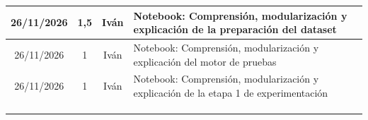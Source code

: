 \documentclass[a4paper]{article}
\begin{document}
\begin{longtable}{|c|c|c|>{\centering\arraybackslash}p{}|}
26/11/2026 & 1,5 & Iván & Notebook: Comprensión, modularización y explicación de la preparación del dataset\\\hline
26/11/2026 & 1 & Iván & Notebook: Comprensión, modularización y explicación del motor de pruebas\\\hline
26/11/2026 & 1 & Iván & Notebook: Comprensión, modularización y explicación de la etapa 1 de experimentación\\\hline
& & & \\\hline
& & & \\\hline
& & & \\\hline
\end{longtable}




\end{document}
